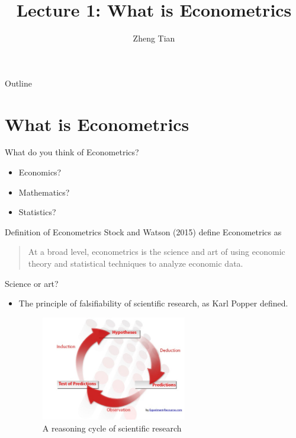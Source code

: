 \documentclass[presentation]{beamer}
\author{Zheng Tian}
\date{}
\title{Lecture 1: What is Econometrics}
\begin{document}
\maketitle
\begin{frame}{Outline}
\setcounter{tocdepth}{1}
\tableofcontents
\end{frame}



\section{What is Econometrics}
\label{sec:orgace6ef0}
\setcounter{tocdepth}{1}
\tableofcontents[currentsection]

\begin{frame}[label={sec:org6ad0bc0}]{What do you think of Econometrics?}
\begin{itemize}
\item Economics?
\item Mathematics?
\item Statistics?
\end{itemize}
\end{frame}


\begin{frame}[label={sec:orgaff73b4}]{Definition of Econometrics}
Stock and Watson (2015) define Econometrics as

\begin{quote}
At a broad level, econometrics is the science and art of using
economic theory and statistical techniques to analyze economic
data.
\end{quote}
\end{frame}


\begin{frame}[label={sec:org1fbec6d}]{Science or art?}
\begin{itemize}
\item The principle of \alert{falsifiability} of scientific research, as Karl Popper
defined.

\begin{figure}[htbp]
\centering
\includegraphics[width=0.6\textwidth,height=0.6\textheight]{figure/reasoning-cycle-research.jpg}
\caption{A reasoning cycle of scientific research}
\end{figure}
\end{itemize}
\end{frame}
\end{document}
